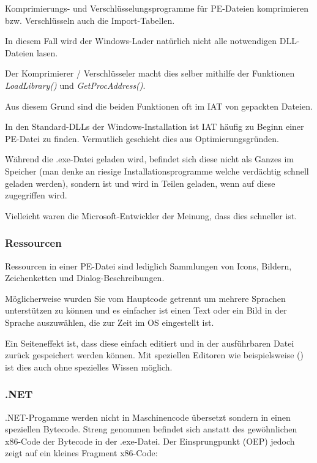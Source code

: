 Komprimierungs- und Verschlüsselungsprogramme für PE-Dateien komprimieren bzw.
Verschlüsseln auch die Import-Tabellen.

In diesem Fall wird der Windows-Lader natürlich nicht alle notwendigen DLL-Dateien lasen.

Der Komprimierer / Verschlüsseler macht dies selber mithilfe der Funktionen
\emph{LoadLibrary()} und \emph{GetProcAddress()}.

Aus diesem Grund sind die beiden Funktionen oft im \ac{IAT} von gepackten Dateien.

In den Standard-DLLs der Windows-Installation ist \ac{IAT} häufig zu Beginn einer
PE-Datei zu finden. Vermutlich geschieht dies aus Optimierungsgründen.

Während die .exe-Datei geladen wird, befindet sich diese nicht als Ganzes im Speicher
(man denke an riesige Installationsprogramme welche verdächtig schnell geladen werden),
sondern ist  und wird in Teilen geladen, wenn auf diese zugegriffen wird.

Vielleicht waren die Microsoft-Entwickler der Meinung, dass dies schneller ist.

\subsubsection{Ressourcen}

\label{PEresources}

Ressourcen in einer PE-Datei sind lediglich Sammlungen von Icons, Bildern,
Zeichenketten und Dialog-Beschreibungen.

Möglicherweise wurden Sie vom Hauptcode getrennt um mehrere Sprachen unterstützen
zu können und es einfacher ist einen Text oder ein Bild in der Sprache auszuwählen,
die zur Zeit im \ac{OS} eingestellt ist.

Ein Seiteneffekt ist, dass diese einfach editiert und in der ausführbaren Datei
zurück gespeichert werden können. Mit speziellen Editoren wie beispielsweise
() ist dies auch ohne spezielles Wissen möglich.

\subsubsection{.NET}


.NET-Progamme werden nicht in Maschinencode übersetzt sondern in einen speziellen Bytecode.
Streng genommen befindet sich anstatt des gewöhnlichen x86-Code der Bytecode in
der .exe-Datei. Der Einsprungpunkt (\ac{OEP}) jedoch zeigt auf ein kleines Fragment
x86-Code:

